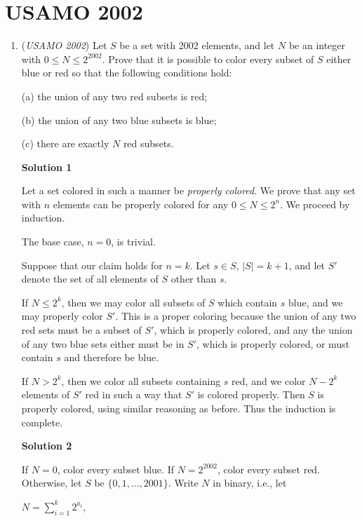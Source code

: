 \section{USAMO 2002}
        \begin{enumerate}
        	\item (\textit{USAMO 2002}) Let $S$ be a set with 2002 elements, and let $N$ be an integer with $0 \le N \le 2^{2002}$.  Prove that it is possible to color every subset of $S$ either blue or red so that the following conditions hold:


 (a) the union of any two red subsets is red;


 (b) the union of any two blue subsets is blue;


 (c) there are exactly $N$ red subsets.


 



\textbf{Solution 1}

Let a set colored in such a manner be \textit{properly colored}.  We prove that any set with $n$ elements can be properly colored for any $0 \le N \le 2^n$.  We proceed by induction.

 The base case, $n = 0$, is trivial.

 Suppose that our claim holds for $n = k$.  Let $s \in S$, $|S| = k + 1$, and let $S'$ denote the set of all elements of $S$ other than $s$.

 If $N \le 2^k$, then we may color all subsets of $S$ which contain $s$ blue, and we may properly color $S'$.  This is a proper coloring because the union of any two red sets must be a subset of $S'$, which is properly colored, and any the union of any two blue sets either must be in $S'$, which is properly colored, or must contain $s$ and therefore be blue.

 If $N > 2^k$, then we color all subsets containing $s$ red, and we color $N - 2^k$ elements of $S'$ red in such a way that $S'$ is colored properly.  Then $S$ is properly colored, using similar reasoning as before.  Thus the induction is complete.

 



\textbf{Solution 2}

If $N = 0$, color every subset blue.  If $N = 2^{2002}$, color every subset red.  Otherwise, let $S$ be $\{ 0, 1, \ldots , 2001 \}$.  Write $N$ in binary, i.e., let

 $N = \sum_{i=1}^{k} 2^{a_i}$,

 


\end{enumerate}
